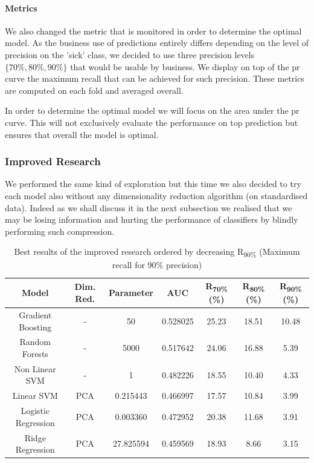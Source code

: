 \paragraph{Metrics}
We also changed the metric that is monitored in order to determine the optimal model. As the business use of predictions entirely differs depending on the level of precision on the 'sick' class, we decided to use three precision levels $\{70\%,80\%,90\%\}$ that would be usable by business. We display on top of the \acrshort{pr} curve the maximum recall that can be achieved for such precision. These metrics are computed on each fold and averaged overall. 

In order to determine the optimal model we will focus on the area under the \acrshort{pr} curve. This will not exclusively evaluate the performance on top prediction but ensures that overall the model is optimal.

\subsubsection{Improved Research}
We performed the same kind of exploration but this time we also decided to try each model also without any dimensionality reduction algorithm (on standardised data). Indeed as we shall discuss it in the next subsection we realised that we may be losing information and hurting the performance of classifiers by blindly performing such compression.

\begin{table}[h]
\begin{center}
\begin{tabular}{c c c c c c c}
\hline
\textbf{Model} & \textbf{Dim. Red.} & \textbf{Parameter} & \textbf{AUC}& \textbf{R\textsubscript{70\%}(\%)} & \textbf{R\textsubscript{80\%}(\%)} & \textbf{R\textsubscript{90\%}(\%)} \\ 
\hline\hline
Gradient Boosting 	& - 		& 50 		& 0.528025 & 25.23 	& 18.51 & 10.48 \\
Random Forests 		& - 		& 5000		& 0.517642 & 24.06 	& 16.88 & 5.39\\
Non Linear SVM  	& - 		& 1	 		& 0.482226 & 18.55 	& 10.40 & 4.33\\
Linear SVM 			& PCA 	& 0.215443 	& 0.466997 & 17.57 	& 10.84 & 3.99\\
Logistic Regression & PCA 	& 0.003360 	& 0.472952 & 20.38 	& 11.68 & 3.91\\
Ridge Regression 	& PCA 	& 27.825594 	& 0.459569 & 18.93 	& 8.66 	& 3.15\\
\end{tabular}
\end{center}
\caption{\label{improved_results} Best results of the improved research ordered by decreasing R\textsubscript{90\%} (Maximum recall for 90\% precision)}
\end{table}

